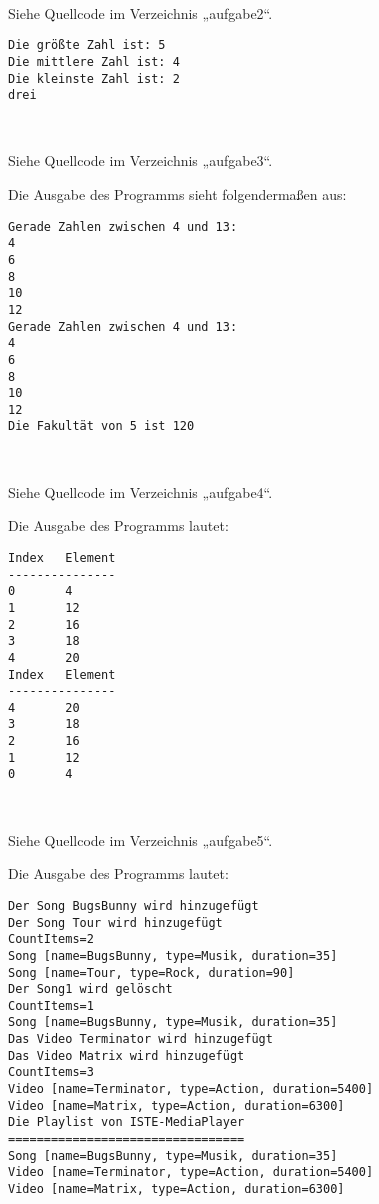 \documentclass{mywork}
\begin{document}
\setcounter{aufgabe}{1}

\begin{aufgabe}~

	Siehe Quellcode im Verzeichnis „aufgabe2“.
	\begin{verbatim}
Die größte Zahl ist: 5
Die mittlere Zahl ist: 4
Die kleinste Zahl ist: 2
drei
	\end{verbatim}
\end{aufgabe}

\begin{aufgabe}~

	Siehe Quellcode im Verzeichnis „aufgabe3“.

	Die Ausgabe des Programms sieht folgendermaßen aus:
	\begin{verbatim}
Gerade Zahlen zwischen 4 und 13:
4
6
8
10
12
Gerade Zahlen zwischen 4 und 13:
4
6
8
10
12
Die Fakultät von 5 ist 120
	\end{verbatim}
\end{aufgabe}

\begin{aufgabe}~

	Siehe Quellcode im Verzeichnis „aufgabe4“.

	Die Ausgabe des Programms lautet:
	\begin{verbatim}
Index   Element
---------------
0       4
1       12
2       16
3       18
4       20
Index   Element
---------------
4       20
3       18
2       16
1       12
0       4
	\end{verbatim}
\end{aufgabe}

\begin{aufgabe}~

		
\end{aufgabe}
	Siehe Quellcode im Verzeichnis „aufgabe5“.

	Die Ausgabe des Programms lautet:
	\begin{verbatim}
Der Song BugsBunny wird hinzugefügt
Der Song Tour wird hinzugefügt
CountItems=2
Song [name=BugsBunny, type=Musik, duration=35]
Song [name=Tour, type=Rock, duration=90]
Der Song1 wird gelöscht
CountItems=1
Song [name=BugsBunny, type=Musik, duration=35]
Das Video Terminator wird hinzugefügt
Das Video Matrix wird hinzugefügt
CountItems=3
Video [name=Terminator, type=Action, duration=5400]
Video [name=Matrix, type=Action, duration=6300]
Die Playlist von ISTE-MediaPlayer
=================================
Song [name=BugsBunny, type=Musik, duration=35]
Video [name=Terminator, type=Action, duration=5400]
Video [name=Matrix, type=Action, duration=6300]		
	\end{verbatim}
\end{document}
